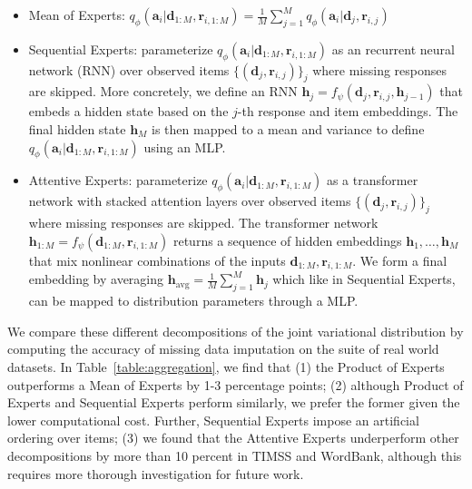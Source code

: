 \begin{itemize}
    \item Mean of Experts: $q_\phi(\mathbf{a}_i|\mathbf{d}_{1:M},\mathbf{r}_{i,1:M}) = \frac{1}{M}\sum_{j=1}^M q_\phi(\mathbf{a}_i|\mathbf{d}_j,\mathbf{r}_{i,j})$
    \item Sequential Experts: parameterize $q_\phi(\mathbf{a}_i|\mathbf{d}_{1:M},\mathbf{r}_{i,1:M})$ as an recurrent neural network (RNN) over observed items $\{(\mathbf{d}_j, \mathbf{r}_{i,j})\}_j$ where missing responses are skipped. More concretely, we define an RNN $\mathbf{h}_j = f_\psi(\mathbf{d}_j, \mathbf{r}_{i,j}, \mathbf{h}_{j-1})$ that embeds a hidden state based on the $j$-th response and item embeddings. The final hidden state $\mathbf{h}_M$ is then mapped to a mean and variance to define $q_\phi(\mathbf{a}_i|\mathbf{d}_{1:M},\mathbf{r}_{i,1:M})$ using an MLP.
    \item Attentive Experts: parameterize $q_\phi(\mathbf{a}_i|\mathbf{d}_{1:M},\mathbf{r}_{i,1:M})$ as a transformer network with stacked attention layers over observed items $\{(\mathbf{d}_j, \mathbf{r}_{i,j})\}_j$ where missing responses are skipped. The transformer network $\mathbf{h}_{1:M} = f_\psi(\mathbf{d}_{1:M},\mathbf{r}_{i,1:M})$ returns a sequence of hidden embeddings $\mathbf{h}_1, \ldots, \mathbf{h}_M$ that mix nonlinear combinations of the inputs $\mathbf{d}_{1:M},\mathbf{r}_{i,1:M}$. We form a final embedding by averaging $\mathbf{h}_{\text{avg}} = \frac{1}{M}\sum_{j=1}^M \mathbf{h}_j$ which like in Sequential Experts, can be mapped to distribution parameters through a MLP.
\end{itemize}

We compare these different decompositions of the joint variational distribution by computing the accuracy of missing data imputation on the suite of real world datasets. In Table~\ref{table:aggregation}, we find that (1) the Product of Experts outperforms a Mean of Experts by 1-3 percentage points; (2) although Product of Experts and Sequential Experts perform similarly, we prefer the former given the lower computational cost. Further, Sequential Experts impose an artificial ordering over items; (3) we found that the Attentive Experts underperform other decompositions by more than 10 percent in TIMSS and WordBank, although this requires more thorough investigation for future work.

